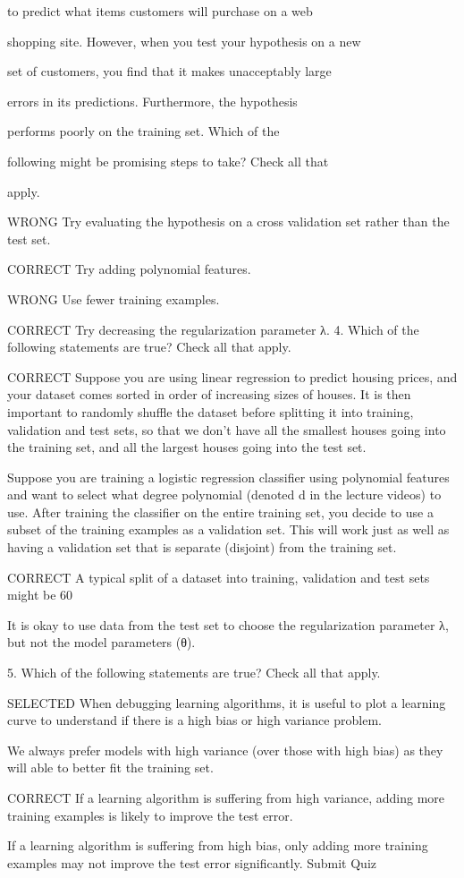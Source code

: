to predict what items customers will purchase on a web

shopping site. However, when you test your hypothesis on a new

set of customers, you find that it makes unacceptably large

errors in its predictions. Furthermore, the hypothesis

performs poorly on the training set. Which of the

following might be promising steps to take? Check all that

apply.


WRONG Try evaluating the hypothesis on a cross validation set rather than the test set.


CORRECT  Try adding polynomial features.

WRONG Use fewer training examples.

CORRECT Try decreasing the regularization parameter λ.
4. 
Which of the following statements are true? Check all that apply.

CORRECT Suppose you are using linear regression to predict housing prices, and your dataset comes sorted in order of increasing sizes of houses. It is then important to randomly shuffle the dataset before splitting it into training, validation and test sets, so that we don’t have all the smallest houses going into the training set, and all the largest houses going into the test set.

Suppose you are training a logistic regression classifier using polynomial features and want to select what degree polynomial (denoted d in the lecture videos) to use. After training the classifier on the entire training set, you decide to use a subset of the training examples as a validation set. This will work just as well as having a validation set that is separate (disjoint) from the training set.

CORRECT A typical split of a dataset into training, validation and test sets might be 60%

It is okay to use data from the test set to choose the regularization parameter λ, but not the model parameters (θ).

5. 
Which of the following statements are true? Check all that apply.

SELECTED When debugging learning algorithms, it is useful to plot a learning curve to understand if there is a high bias or high variance problem.

We always prefer models with high variance (over those with high bias) as they will able to better fit the training set.

CORRECT If a learning algorithm is suffering from high variance, adding more training examples is likely to improve the test error.

If a learning algorithm is suffering from high bias, only adding more training examples may not improve the test error significantly.
Submit Quiz


